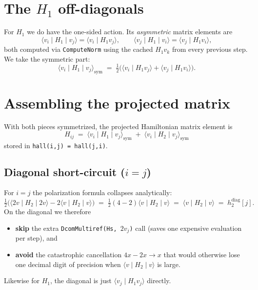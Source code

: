 \documentclass[11pt]{article}
\begin{document}
\section{The $H_1$ off-diagonals}

For $H_1$ we do have the one-sided action.  Its \emph{asymmetric}
matrix elements are
\begin{equation}
  \langle v_i \mid H_1 \mid v_j \rangle
  = \langle v_i \mid H_1 v_j \rangle,
  \qquad
  \langle v_j \mid H_1 \mid v_i \rangle
  = \langle v_j \mid H_1 v_i \rangle,
\end{equation}
both computed via \texttt{ComputeNorm} using the cached $H_1 v_k$
from every previous step.  We take the symmetric part:
\begin{equation}
  \langle v_i \mid H_1 \mid v_j \rangle_{\mathrm{sym}}
  \;=\;
  \tfrac{1}{2}\bigl(
    \langle v_i \mid H_1 v_j \rangle
    + \langle v_j \mid H_1 v_i \rangle
  \bigr).
\end{equation}

\section{Assembling the projected matrix}

With both pieces symmetrized, the projected Hamiltonian matrix element
is
\begin{equation}
  \boxed{
  H_{ij}
  \;=\;
  \langle v_i \mid H_1 \mid v_j \rangle_{\mathrm{sym}}
  \;+\;
  \langle v_i \mid H_2 \mid v_j \rangle_{\mathrm{sym}}
  }
\end{equation}
stored in \texttt{hall(i,j) = hall(j,i)}.

\subsection*{Diagonal short-circuit ($i = j$)}

For $i = j$ the polarization formula collapses analytically:
\begin{equation}
  \tfrac{1}{2}\bigl(
    \langle 2v \mid H_2 \mid 2v \rangle
    - 2\langle v \mid H_2 \mid v \rangle
  \bigr)
  \;=\;
  \tfrac{1}{2}(4 - 2)\langle v \mid H_2 \mid v \rangle
  \;=\;
  \langle v \mid H_2 \mid v \rangle
  \;=\;
  h_2^{\mathrm{diag}}[j].
\end{equation}
On the diagonal we therefore
\begin{itemize}
  \item \textbf{skip} the extra \texttt{DcomMultiref(Hs, $2v_j$)} call
        (saves one expensive evaluation per step), and
  \item \textbf{avoid} the catastrophic cancellation
        $4x - 2x \to x$ that would otherwise lose one decimal digit of
        precision when $\langle v \mid H_2 \mid v \rangle$ is large.
\end{itemize}
Likewise for $H_1$, the diagonal is just
$\langle v_j \mid H_1 v_j \rangle$ directly.
\end{document}
